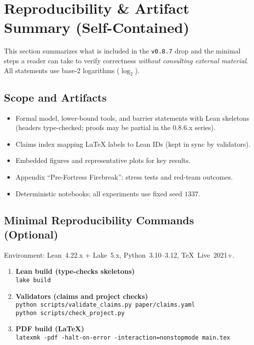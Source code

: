 
\section{Reproducibility \& Artifact Summary (Self-Contained)}
\label{sec:repro}

This section summarizes what is included in the \texttt{v0.8.7} drop and the minimal steps a reader can take to verify correctness \emph{without consulting external material}. All statements use base-2 logarithms (\(\log_{2}\)).

\subsection{Scope and Artifacts}
\begin{itemize}
  \item Formal model, lower-bound tools, and barrier statements with Lean skeletons (headers type-checked; proofs may be partial in the 0.8.6.x series).
  \item Claims index mapping LaTeX labels to Lean IDs (kept in sync by validators).
  \item Embedded figures and representative plots for key results.
  \item Appendix ``Pre-Fortress Firebreak'': stress tests and red-team outcomes.
  \item Deterministic notebooks; all experiments use fixed seed \(1337\).
\end{itemize}

\subsection{Minimal Reproducibility Commands (Optional)}
Environment: Lean~4.22.x + Lake~5.x, Python~3.10--3.12, \TeX~Live~2021+.
\begin{enumerate}
  \item \textbf{Lean build (type-checks skeletons)}\\
  \texttt{lake build}
  \item \textbf{Validators (claims and project checks)}\\
  \texttt{python scripts/validate\_claims.py\ paper/claims.yaml}\\
  \texttt{python scripts/check\_project.py}
  \item \textbf{PDF build (\LaTeX)}\\
  \texttt{latexmk -pdf -halt-on-error -interaction=nonstopmode main.tex}
\end{enumerate}

